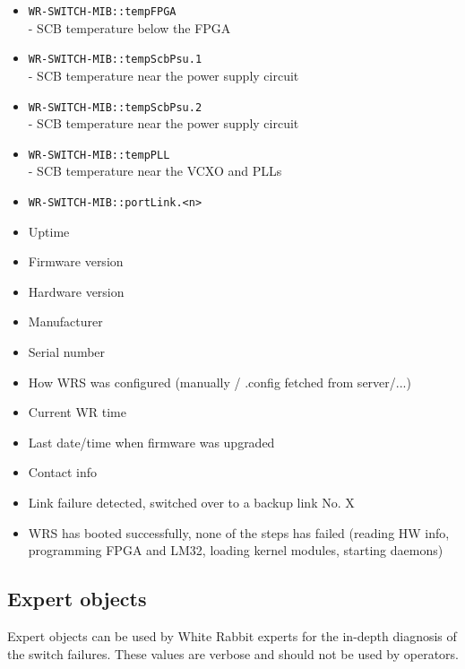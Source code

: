 \begin{itemize}[leftmargin=0pt]
	\item [] \texttt{WR-SWITCH-MIB::tempFPGA}\\ - SCB temperature below the FPGA
	\item [] \texttt{WR-SWITCH-MIB::tempScbPsu.1}\\ - SCB temperature near the
		power supply circuit
	\item [] \texttt{WR-SWITCH-MIB::tempScbPsu.2}\\ - SCB temperature near the
		power supply circuit
	\item [] \texttt{WR-SWITCH-MIB::tempPLL}\\ - SCB temperature near the VCXO and
		PLLs

	\item [] \texttt{WR-SWITCH-MIB::portLink.<n>}
\end{itemize}

\begin{itemize}
	\item Uptime
	\item Firmware version
	\item Hardware version
	\item Manufacturer
	\item Serial number
	\item How WRS was configured (manually / .config fetched from server/...)
	\item Current WR time
	\item Last date/time when firmware was upgraded
	\item Contact info
	\item Link failure detected, switched over to a backup link No. X
	\item WRS has booted successfully, none of the steps has failed (reading HW
		info, programming FPGA and LM32, loading kernel modules, starting daemons)
\end{itemize}

\newpage
\subsection{Expert objects}
Expert objects can be used by White Rabbit experts for the in-depth diagnosis of
the switch failures. These values are verbose and should not be used by
operators.


